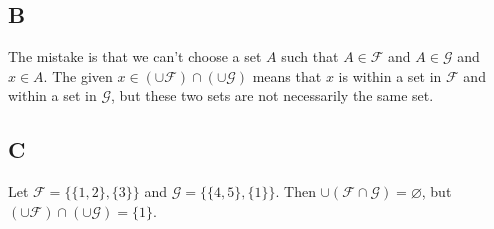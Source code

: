 \documentclass{article}
\newcommand{\F}{\mathcal{F}}
\newcommand{\G}{\mathcal{G}}
\begin{document}
\subsection*{B}
The mistake is that we can't choose a set $A$ such that $A \in \F$ and $A \in \G$ and $x \in A$. The given $x \in (\cup \F) \cap (\cup \G)$ means that $x$ is within a set in $\F$ and within a set in $\G$, but these two sets are not necessarily the same set.

\subsection*{C}
Let $\F = \{\{1,2\}, \{3\}\}$ and $\G = \{\{4,5\}, \{1\}\}$. Then $\cup (\F \cap \G) = \varnothing$, but $(\cup \F) \cap (\cup \G) = \{1\}$.
\end{document}
